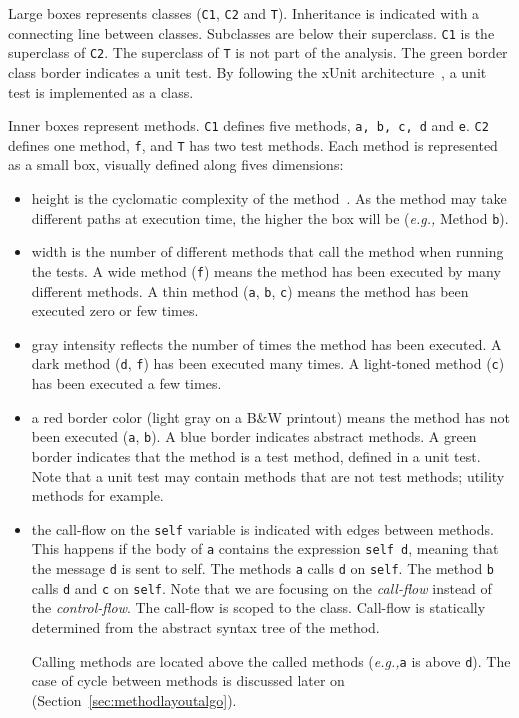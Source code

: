 \documentclass[runningheads]{llncs}
\newcommand{\ct}{\lstinline[backgroundcolor=\color{white},basicstyle=\footnotesize\ttfamily]}
\newcommand{\eg}{\emph{e.g.,}\xspace}
\newcommand{\secref}[1]{Section~\ref{sec:#1}}
\begin{document}
Large boxes represents classes (\ct{C1}, \ct{C2} and \ct{T}). Inheritance is indicated with a connecting line between classes. Subclasses are below their superclass. \ct{C1} is the superclass of \ct{C2}. The superclass of \ct{T} is not part of the analysis. The green border class border indicates a unit test. By following the xUnit architecture~\cite{Beck03a}, a unit test is implemented as a class.

Inner boxes represent methods. \ct{C1} defines five methods, \ct{a, b, c, d} and \ct{e}. \ct{C2} defines one method, \ct{f}, and \ct{T} has two test methods. Each method is represented as a small box, visually defined along fives dimensions:

\begin{itemize}
\item height is the cyclomatic complexity of the method~\cite{McCa76a}. As the method may take different paths at execution time, the higher the box will be (\eg Method \ct{b}).
\item width is the number of different methods that call the method when running the tests. A wide method (\ct{f}) means the method has been executed by many different methods. A thin method (\ct{a}, \ct{b}, \ct{c}) means the method has been executed zero or few times.
\item gray intensity reflects the number of times the method has been executed. A dark method (\ct{d}, \ct{f}) has been executed many times. A light-toned method (\ct{c}) has been executed a few times.
\item a red border color (light gray on a B\&W printout) means the method has not been executed (\ct{a}, \ct{b}). A blue border indicates abstract methods. A green border indicates that the method is a test method, defined in a unit test. Note that a unit test may contain methods that are not test methods; utility methods for example.

\item the call-flow on the \ct{self} variable is indicated with edges between methods. This happens if the body of \ct{a} contains the expression \ct{self d}, meaning that the message \ct{d} is sent to self. The methods \ct{a} calls \ct{d} on \ct{self}. The method \ct{b} calls \ct{d} and \ct{c} on \ct{self}. Note that we are focusing on the \emph{call-flow} instead of the \emph{control-flow}. The call-flow is scoped to the class. Call-flow is statically determined from the abstract syntax tree of the method. 

Calling methods are located above the called methods (\eg \ct{a} is above \ct{d}). The case of cycle between methods is discussed later on (\secref{methodlayoutalgo}).
\end{itemize}
\end{document}

